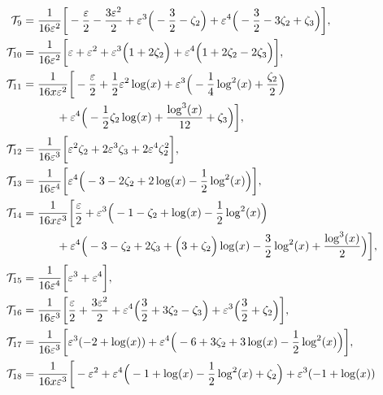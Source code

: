 \documentclass[final,1p,times]{elsarticle}
\begin{document}
\begin{align}
% 
\mi_9 &=   \frac{1}{16 \ep^2}  \bigg[
% 
-\frac{\ep}{2}
-\frac{3 \ep^2}{2}
+\ep^3 \Big(
        -\frac{3}{2}
        -\zeta_2
\Big)
+\ep^4 \Big(
        -\frac{3}{2}
        -3 \zeta_2
        +\zeta_3
\Big)
% 
\bigg],
% 
\nonumber\\
% 
\mi_{10} &=   \frac{1}{16 \ep^2}  \bigg[
% 
\ep
+\ep^2
+\ep^3 \Big(
        1
        +2 \zeta_2
\Big)
+\ep^4 \Big(
        1
        +2 \zeta_2
        -2 \zeta_3
\Big)
% 
\bigg],
% 
\nonumber\\
% 
\mi_{11} &=   \frac{1}{16 x \ep^2}  \bigg[
% 
-\frac{\ep}{2}
+\frac{1}{2} \ep^2 \log (x)
+\ep^3 \Big(
        -\frac{1}{4} \log ^2(x)
        +\frac{\zeta_2}{2}
\Big)
\nonumber\\& \qquad \quad
+\ep^4 \Big(
        -\frac{1}{2} \zeta_2 \log (x)
        +\frac{\log ^3(x)}{12}
        +\zeta_3
\Big)
% 
\bigg],
% 
\nonumber\\
% 
\mi_{12} &=   \frac{1}{16 \ep^3}  \bigg[
% 
\ep^2 \zeta_2
+2 \ep^3 \zeta_3
+2 \ep^4 \zeta_2^2
% 
\bigg],
% 
\nonumber\\
% 
\mi_{13} &=   \frac{1}{16 \ep^4}  \bigg[
% 
\ep^4 \Big(
        -3
        -2 \zeta_2
        +2 \log (x)
        -\frac{1}{2} \log ^2(x)
\Big)
\bigg],
% 
\nonumber\\
% 
\mi_{14} &=   \frac{1}{16 x \ep^3}  \bigg[
% 
\frac{\ep}{2}
+\ep^3 \Big(
        -1
        -\zeta_2
        +\log (x)
        -\frac{1}{2} \log ^2(x)
\Big)
\nonumber\\& \qquad \quad
+\ep^4 \Big(
        -3
        -\zeta_2
        +2 \zeta_3
        +\Big(
                3
                +\zeta_2
        \Big) \log (x)
        -\frac{3}{2} \log ^2(x)
        +\frac{\log ^3(x)}{2}
\Big)
% 
\bigg],
% 
\nonumber\\
% 
\mi_{15} &=   \frac{1}{16 \ep^4}  \bigg[
% 
\ep^3
+\ep^4
% 
\bigg],
% 
\nonumber\\
% 
\mi_{16} &=   \frac{1}{16 \ep^3}  \bigg[
% 
\frac{\ep}{2}
+\frac{3 \ep^2}{2}
+\ep^4 \Big(
        \frac{3}{2}
        +3 \zeta_2
        -\zeta_3
\Big)
+\ep^3 \Big(
        \frac{3}{2}
        +\zeta_2
\Big)
% 
\bigg],
% 
\nonumber\\
% 
\mi_{17} &=   \frac{1}{16 \ep^3}  \bigg[
% 
\ep^3 (-2+\log (x))
+\ep^4 \Big(
        -6
        +3 \zeta_2
        +3 \log (x)
        -\frac{1}{2} \log ^2(x)
\Big)
% 
\bigg],
% 
\nonumber\\
% 
\mi_{18} &=   \frac{1}{16 x \ep^3}  \bigg[
% 
-\ep^2
+\ep^4 \Big(
        -1
        +\log (x)
        -\frac{1}{2} \log ^2(x)
        +\zeta_2
\Big)
+\ep^3 (-1+\log (x))

\end{align}
\end{document}
